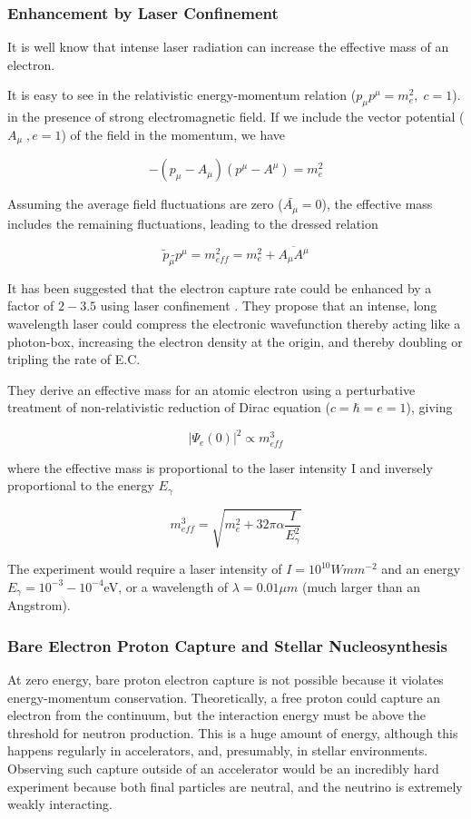 \documentclass[%
 aip,
 jmp,%
 amsmath,amssymb,
 reprint,%
]{revtex4-1}
\begin{document}
\subsubsection{Enhancement by Laser Confinement}

It is well know that intense laser radiation can increase the effective mass of an electron.

It is easy to see in the relativistic energy-momentum relation ($p_{\mu}p^{\mu}=m_{e}^{2},\;c=1$). in the presence of strong electromagnetic field.  
If we include the vector potential ($A_{\mu}\;,e=1$) of the field in the momentum, we have

$$-(p_{\mu}-A_{\mu})(p^{\mu}-A^{\mu})=m_{e}^{2}$$

Assuming the average field fluctuations are zero ($\bar{A_{\mu}}=0$), the effective mass includes the remaining fluctuations, leading to the dressed relation

$$\tilde{p}_{\mu}\tilde{}p^{\mu}=m_{eff}^{2}=m_{e}^{2}+\overline{A_{\mu}A^{\mu}}$$

It has been suggested that the electron capture rate could be enhanced by a factor of $2-3.5$ using laser confinement \cite{sato}.
They propose that an intense, long wavelength laser could compress the electronic wavefunction thereby acting like a photon-box,
increasing the electron density at the origin, and thereby doubling or tripling the rate of E.C.  

They derive an effective mass for an atomic electron using a perturbative treatment of non-relativistic reduction of Dirac equation ($c=\hbar=e=1$), giving

$$\big\vert\Psi_{e}(0)\big\vert^{2}\propto m_{eff}^{3}$$

where the effective mass is proportional to the laser intensity I and inversely proportional to the energy $E_{\gamma}$

$$m_{eff}^{3}=\sqrt{m_{e}^{2}+32\pi\alpha\dfrac{I}{E^{2}_{\gamma}}}$$

The experiment would require a laser intensity of $I=10^{10}Wmm^{-2}$ and an energy $E_{\gamma}=10^{-3}-10^{-4}$eV, or a wavelength of $\lambda=0.01\mu m$ (much larger than an Angstrom).  
  
\subsubsection{Bare Electron Proton Capture and Stellar Nucleosynthesis}

At zero energy, bare proton electron capture is not possible because it violates energy-momentum conservation. Theoretically, a free proton could capture an electron from the continuum, but the interaction energy must be above the threshold for neutron production.  This is a huge amount of energy, although this happens regularly in accelerators, and, presumably, in stellar environments.  Observing such capture outside of an accelerator would be an incredibly hard experiment  because both final particles are neutral, and the neutrino is extremely weakly interacting.  
\end{document}
